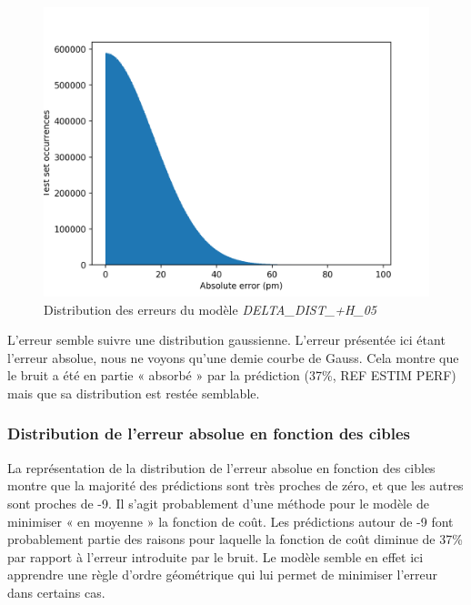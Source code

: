 \begin{figure}[!h]
	\centering
	
	\includegraphics[scale=0.7]{../figures/DELTA_DIST_+H_05/DELTA_DIST+H_05_distrib_rmse_val.png}	
	
	\caption{Distribution des erreurs du modèle \emph{DELTA\_DIST\_+H\_05}}
\end{figure}

L'erreur semble suivre une distribution gaussienne. L'erreur présentée ici étant l'erreur absolue, nous ne voyons qu'une demie courbe de Gauss. Cela montre que le bruit a été en partie « absorbé » par la prédiction (37\%, REF ESTIM PERF) mais que sa distribution est restée semblable.

\subsubsection{Distribution de l'erreur absolue en fonction des cibles}

La représentation de la distribution de l'erreur absolue en fonction des cibles montre que la majorité des prédictions sont très proches de zéro, et que les autres sont proches de -9. Il s'agit probablement d'une méthode pour le modèle de minimiser « en moyenne » la fonction de coût. Les prédictions autour de -9 font probablement partie des raisons pour laquelle la fonction de coût diminue de 37\% par rapport à l'erreur introduite par le bruit. Le modèle semble en effet ici apprendre une règle d'ordre géométrique qui lui permet de minimiser l'erreur dans certains cas.


